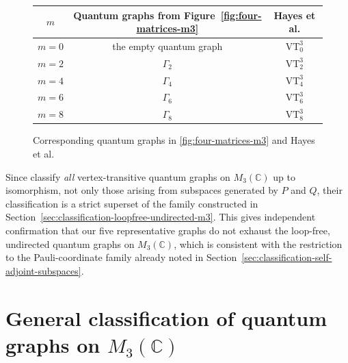 \begin{figure}[h]
    \begin{center}
        \begin{tabular}{| c | c | c |}
            \hline
            \( m \) & Quantum graphs from Figure~\ref{fig:four-matrices-m3} &
            Hayes et al. \\
            \hline
            \( m = 0 \) & the empty quantum graph & \(
            \mathrm{VT}^{3}_{0} \) \\
            \hline
            \( m = 2 \) & \( \Gamma_2 \) & \( \mathrm{VT}^{3}_{2} \) \\
            \hline
            \( m = 4 \) & \( \Gamma_4 \) & \( \mathrm{VT}^{3}_{4} \) \\
            \hline
            \( m = 6 \) & \( \Gamma_6 \) & \( \mathrm{VT}^{3}_{6} \) \\
            \hline
            \( m = 8 \) & \( \Gamma_8 \) & \( \mathrm{VT}^{3}_{8} \) \\
            \hline
        \end{tabular}
        \caption{Corresponding quantum graphs in
        \ref{fig:four-matrices-m3} and Hayes et al. }
        \label{tab:our-graphs-are-vertex-transitive}
    \end{center}
\end{figure}

\begin{remark}
    \label{rem:hayes-classification-is-larger}
    Since \textcite{hayes26} classify \emph{all} vertex-transitive
    quantum graphs on \( M_{3}(\mathbb{C}) \) up to isomorphism, not only those
    arising from subspaces generated by \( P \) and \( Q \), their
    classification is a strict superset of the family constructed in
    Section~\ref{sec:classification-loopfree-undirected-m3}. This
    gives independent confirmation that our five representative graphs
    do not exhaust the loop-free, undirected quantum graphs on
    \( M_{3}(\mathbb{C}) \), which is consistent with the restriction to the
    Pauli-coordinate family already noted in
    Section~\ref{sec:classification-self-adjoint-subspaces}.
\end{remark}

\section{General classification of quantum graphs on \( M_3 (\mathbb{C}) \)}
\label{sec:classification-different-types-of-graphs}

